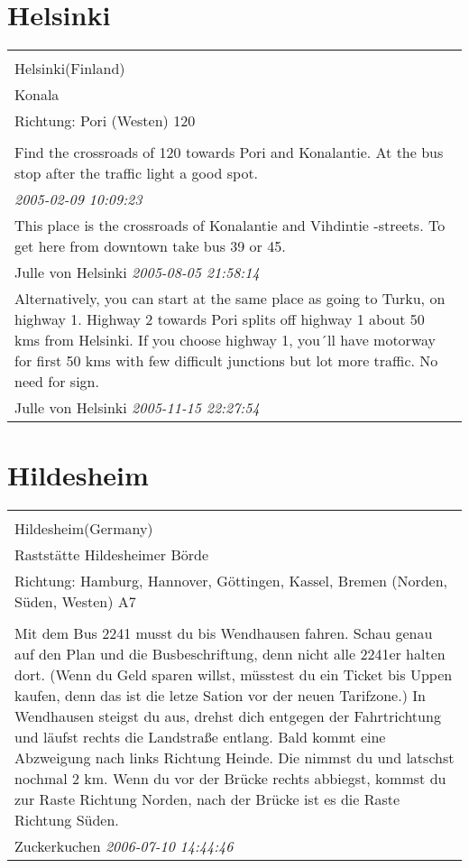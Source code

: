 \documentclass[a4paper,12pt]{article}
\begin{document}
\section{Helsinki}
\begin{tabular}{|p{13cm}|}
\hline\\
Helsinki(Finland)\\
Konala\\
Richtung: Pori (Westen) 120 \\
\hline\\
Find the crossroads of 120 towards Pori and Konalantie. At the bus stop after the traffic light a good spot. \\
\textit{ 2005-02-09 10:09:23 }\\\hline This place is the crossroads of Konalantie and Vihdintie -streets. To get here from downtown take bus 39 or 45. \\
Julle von Helsinki \textit{ 2005-08-05 21:58:14 }\\\hline Alternatively, you can start at the same place as going to Turku, on highway 1. Highway 2 towards Pori splits off highway 1 about 50 kms from Helsinki. If you choose highway 1, you´ll have motorway for first 50 kms with few difficult junctions but lot more traffic. No need for sign. \\
Julle von Helsinki \textit{ 2005-11-15 22:27:54 }\\\hline
\end{tabular}


\section{Hildesheim}
\begin{tabular}{|p{13cm}|}
\hline\\
Hildesheim(Germany)\\
Raststätte Hildesheimer Börde\\
Richtung: Hamburg, Hannover, Göttingen, Kassel, Bremen (Norden, Süden, Westen) A7 \\
\hline\\
Mit dem Bus 2241 musst du bis Wendhausen fahren. Schau genau auf den Plan und die Busbeschriftung, denn nicht alle 2241er halten dort. (Wenn du Geld sparen willst, müsstest du ein Ticket bis Uppen kaufen, denn das ist die letze Sation vor der neuen Tarifzone.)
In Wendhausen steigst du aus, drehst dich entgegen der Fahrtrichtung und läufst rechts die Landstraße entlang. Bald kommt eine Abzweigung nach links Richtung Heinde. Die nimmst du und latschst nochmal 2 km.
Wenn du vor der Brücke rechts abbiegst, kommst du zur Raste Richtung Norden, nach der Brücke ist es die Raste Richtung Süden. \\
Zuckerkuchen \textit{ 2006-07-10 14:44:46 }\\\hline
\end{tabular}
\end{document}

